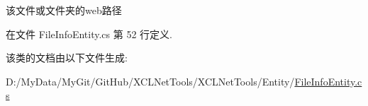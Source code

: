 该文件或文件夹的web路径 



在文件 File\-Info\-Entity.\-cs 第 52 行定义.



该类的文档由以下文件生成\-:\begin{DoxyCompactItemize}
\item 
D\-:/\-My\-Data/\-My\-Git/\-Git\-Hub/\-X\-C\-L\-Net\-Tools/\-X\-C\-L\-Net\-Tools/\-Entity/\hyperlink{_file_info_entity_8cs}{File\-Info\-Entity.\-cs}\end{DoxyCompactItemize}
